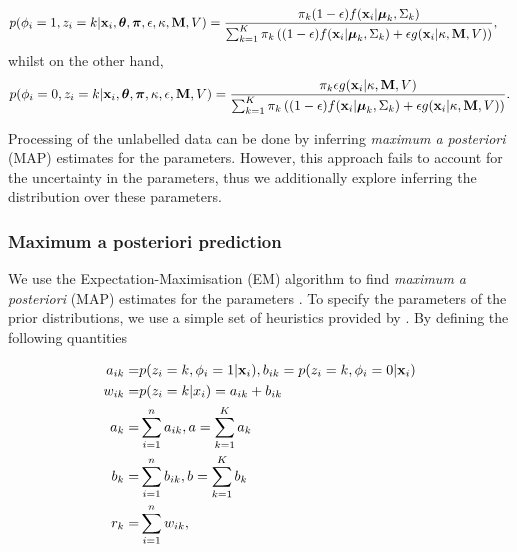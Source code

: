 \documentclass[12pt,english]{article}\usepackage[]{graphicx}\usepackage[]{color}
\begin{document}
\begin{equation}\label{equation::estep1}
\begin{split}
p(\phi_i = 1, z_i = k|{\bf x}_i, \boldsymbol{\theta}, \boldsymbol{\pi} , \epsilon,\kappa, {\bf M}, V)  & = \frac{\pi_k(1-\epsilon)f({\bf x}_i|\boldsymbol{\mu}_k, \Sigma_{k})}{\sum_{k=1}^{K}\pi_k\left((1-\epsilon) f({\bf x}_i|\boldsymbol{\mu}_k, \Sigma_k) + \epsilon g({\bf x}_i|\kappa, {\bf M}, V)\right)},
\end{split}
\end{equation}
whilst on the other hand,
\begin{equation}\label{equation::estep2}
\begin{split}
p(\phi_i = 0, z_i = k|{\bf x}_i, \boldsymbol{\theta}, \boldsymbol{\pi},\kappa, \epsilon, {\bf M}, V)  = \frac{\pi_k \epsilon g({\bf x}_i|\kappa, {\bf M}, V)}{\sum_{k=1}^{K}\pi_k\left((1-\epsilon) f({\bf x}_i|\boldsymbol{\mu}_k, \Sigma_k) + \epsilon g({\bf x}_i|\kappa, {\bf M}, V)\right)}.
\end{split}
\end{equation}

Processing of the unlabelled data can be done by inferring {\em maximum
  a posteriori} (MAP) estimates for the parameters. However, this
approach fails to account for the uncertainty in the parameters, thus
we additionally explore inferring the distribution over these
parameters.

\subsubsection*{Maximum a posteriori prediction}

We use the Expectation-Maximisation (EM) algorithm \citep{EM:1977} to
find {\em maximum a posteriori} (MAP) estimates for the parameters
\cite[see, for example,][]{Murphy:2012}. To specify the parameters of
the prior distributions, we use a simple set of heuristics provided by
\cite{Fraley:2007}. By defining the following quantities

\begin{equation}\label{equation::estepfinal}
\begin{split}
a_{ik} = & p(z_i = k, \phi_i = 1|{\bf x}_i), b_{ik} = p(z_i = k, \phi_i = 0|{\bf x}_i) \\
w_{ik} = & p(z_i = k|x_i) = a_{ik} + b_{ik}\\
a_k = & \sum_{i=1}^{n}a_{ik}, a = \sum_{k=1}^{K}a_k \\
b_k = & \sum_{i=1}^{n}b_{ik}, b = \sum_{k=1}^{K}b_k \\
r_k = & \sum_{i=1}^{n}w_{ik},
\end{split}
\end{equation}
\end{document}
